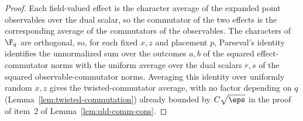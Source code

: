 \begin{proof}
	\leanok
	Each field-valued effect is the character average of the expanded point
	observables over the dual scalar, so the commutator of the two effects is
	the corresponding average of the commutators of the observables. The
	characters of $\F_q$ are orthogonal, so, for each fixed $x,z$ and placement
	$p$, Parseval's identity identifies the unnormalized sum over the outcomes
	$a,b$ of the squared effect-commutator norms with the uniform average over
	the dual scalars $r,s$ of the squared observable-commutator norms.
	Averaging this identity over uniformly random $x,z$ gives the
	twisted-commutator average, with no factor depending on $q$
	(Lemma~\ref{lem:twisted-commutation}) already bounded by $C\sqrt{\eps}$ in
	the proof of item~2 of Lemma~\ref{lem:qld-comm-cons}.
\end{proof}


